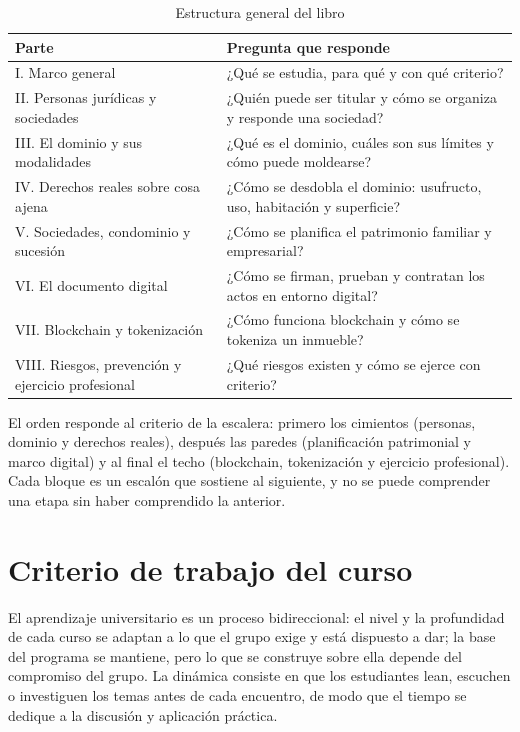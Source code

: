 \documentclass[12pt,oneside]{book}
\begin{document}
\begin{table}[H]
\centering
\caption{Estructura general del libro}
\renewcommand{\arraystretch}{1.2}
\begin{tabularx}{\textwidth}{>{\raggedright\arraybackslash}p{}X}
\toprule
\textbf{Parte} & \textbf{Pregunta que responde} \\
\midrule
I. Marco general & ¿Qué se estudia, para qué y con qué criterio? \\
II. Personas jurídicas y sociedades & ¿Quién puede ser titular y cómo se organiza y responde una sociedad? \\
III. El dominio y sus modalidades & ¿Qué es el dominio, cuáles son sus límites y cómo puede moldearse? \\
IV. Derechos reales sobre cosa ajena & ¿Cómo se desdobla el dominio: usufructo, uso, habitación y superficie? \\
V. Sociedades, condominio y sucesión & ¿Cómo se planifica el patrimonio familiar y empresarial? \\
VI. El documento digital & ¿Cómo se firman, prueban y contratan los actos en entorno digital? \\
VII. Blockchain y tokenización & ¿Cómo funciona blockchain y cómo se tokeniza un inmueble? \\
VIII. Riesgos, prevención y ejercicio profesional & ¿Qué riesgos existen y cómo se ejerce con criterio? \\
\bottomrule
\end{tabularx}
\end{table}

El orden responde al criterio de la escalera: primero los cimientos (personas, dominio y derechos reales), después las paredes (planificación patrimonial y marco digital) y al final el techo (blockchain, tokenización y ejercicio profesional). Cada bloque es un escalón que sostiene al siguiente, y no se puede comprender una etapa sin haber comprendido la anterior.

\section{Criterio de trabajo del curso}

El aprendizaje universitario es un proceso bidireccional: el nivel y la profundidad de cada curso se adaptan a lo que el grupo exige y está dispuesto a dar; la base del programa se mantiene, pero lo que se construye sobre ella depende del compromiso del grupo. La dinámica consiste en que los estudiantes lean, escuchen o investiguen los temas antes de cada encuentro, de modo que el tiempo se dedique a la discusión y aplicación práctica.
\end{document}
